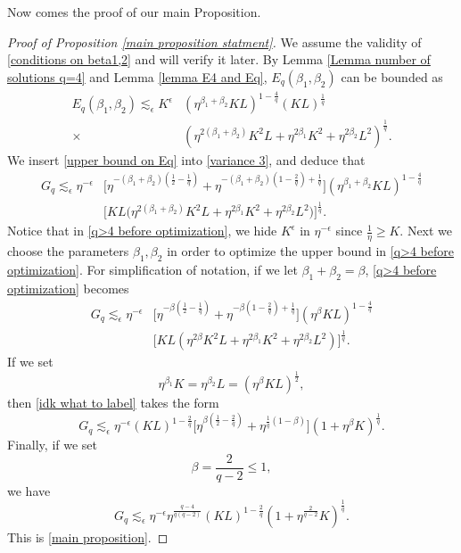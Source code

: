 \documentclass[11pt]{amsart}
\numberwithin{equation}{section}
\theoremstyle{definition}
\theoremstyle{proposition}
\begin{document}
Now comes the proof of our main Proposition.

\begin{proof}  [Proof of Proposition \ref{main proposition statment}]
We assume the validity of \eqref{conditions on beta1,2} and will verify it later. By Lemma \ref{Lemma number of solutions q=4} and Lemma \ref{lemma E4 and Eq}, $E_q(\beta_1,\beta_2)$ can be bounded as   
\begin{equation}  \label{upper bound on Eq}
\begin{split}
E_q(\beta_1,\beta_2)\lesssim_\epsilon K^\epsilon &(\eta^{\beta_1+\beta_2}KL)^{1-\frac{4}{q}} (KL)^{\frac{1}{q}} 
\\ \times & (\eta^{2(\beta_1+\beta_2)}K^2L +\eta^{2\beta_1}K^2+\eta^{2\beta_2}L^2)^{\frac{1}{q}}. 
\end{split}
\end{equation}
We insert \eqref{upper bound on Eq} into \eqref{variance 3}, and deduce that
\begin{equation}   \label{q>4 before optimization}
\begin{split}
G_q\lesssim_\epsilon  \eta^{-\epsilon} &\Big[\eta^{-(\beta_1+\beta_2)(\frac{1}{2}-\frac{1}{q})}+\eta^{-(\beta_1+\beta_2)(1-\frac{2}{q})+\frac{1}{q}}\Big] (\eta^{\beta_1+\beta_2}KL)^{1-\frac{4}{q}} 
\\  & \Big[  KL \Big(\eta^{2(\beta_1+\beta_2)}K^2L+\eta^{2\beta_1}K^2+\eta^{2\beta_2}L^2\Big)  \Big]^{\frac{1}{q}}.  
\end{split}
\end{equation}
Notice that in \eqref{q>4 before optimization}, we hide $K^\epsilon$ in $\eta^{-\epsilon}$ since $\frac{1}{\eta}\ge K$. Next we choose the parameters $\beta_1,\beta_2$ in order to optimize the upper bound in \eqref{q>4 before optimization}. For simplification of notation, if we let $\beta_1+\beta_2=\beta$, \eqref{q>4 before optimization} becomes 
\begin{equation}   \label{idk what to label}
\begin{split}
G_q \lesssim_\epsilon  \eta^{-\epsilon} & \Big[\eta^{-\beta(\frac{1}{2}-\frac{1}{q})}+\eta^{-\beta(1-\frac{2}{q})+\frac{1}{q}}\Big] (\eta^{\beta}KL)^{1-\frac{4}{q}}   
\\ &\Big[KL(\eta^{2\beta}K^2L+\eta^{2\beta_1}K^2+\eta^{2\beta_2}L^2)\Big]^{\frac{1}{q}}.
\end{split}    
\end{equation}
If we set
\begin{equation}  \label{choices of beta1 beta2 q}
\eta^{\beta_1}K=\eta^{\beta_2}L=(\eta^\beta KL)^{\frac{1}{2}},   
\end{equation}
then \eqref{idk what to label} takes the form 
\[
G_q \lesssim_\epsilon \eta^{-\epsilon} (KL)^{1-\frac{2}{q}} \Big[  \eta^{\beta(\frac{1}{2}-\frac{2}{q})}+ \eta^{\frac{1}{q}(1-\beta)}  \Big](1+\eta^\beta K)^{\frac{1}{q}}.
\]
Finally, if we set 
\begin{equation}   \label{q>4 beta value}
\beta=\frac{2}{q-2} \le 1,
\end{equation}
we have 
\[
G_q \lesssim_\epsilon \eta^{-\epsilon} \eta^{\frac{q-4}{q(q-2)}} (KL)^{1-\frac{2}{q}}(1+\eta^{\frac{2}{q-2}}K)^{\frac{1}{q}}. 
\]
This is \eqref{main proposition}. 


\end{proof}
\end{document}
